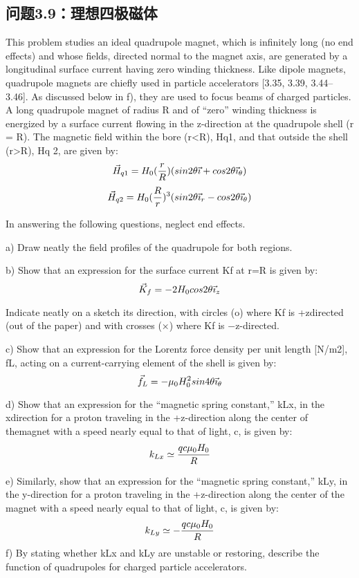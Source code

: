 \subsection{问题3.9：理想四极磁体}
This problem studies an ideal quadrupole magnet, which is infinitely long (no end
effects) and whose fields, directed normal to the magnet axis, are generated by a
longitudinal surface current having zero winding thickness. Like dipole magnets,
quadrupole magnets are chiefly used in particle accelerators [3.35, 3.39, 3.44–3.46].
As discussed below in f), they are used to focus beams of charged particles.
A long quadrupole magnet of radius R and of “zero” winding thickness is energized
by a surface current flowing in the z-direction at the quadrupole shell (r = R).
The magnetic field within the bore (r<R), Hq1, and that outside the shell (r>R),
Hq
2, are given by:
$$
\vec{H}_{q1}=H_{0}(\frac{r}{R})(sin2\theta\vec{\imath}+cos2\theta\vec{\imath}_{\theta})\\%
$$
$$
\vec{H}_{q2}=H_{0}(\frac{R}{r})^{3}(sin2\theta\vec{\imath}_{r}-cos2\theta\vec{\imath}_{\theta})\\%
$$

In answering the following questions, neglect end effects.

a) Draw neatly the field profiles of the quadrupole for both regions.

b) Show that an expression for the surface current Kf at r=R is given by:
$$
\vec{K}_{f}=-2H_{0}cos2\theta\vec{\imath}_{z}\\%
$$

Indicate neatly on a sketch its direction, with circles (o) where Kf is +zdirected (out of the paper) and with crosses (×) where Kf is −z-directed.

c) Show that an expression for the Lorentz force density per unit length [N/m2],
fL, acting on a current-carrying element of the shell is given by:
$$
\vec{f}_{L}=-\mu_{0}H_{0}^{2}sin4\theta\vec{\imath}_{\theta}\\%
$$

d) Show that an expression for the “magnetic spring constant,” kLx, in the xdirection for a proton traveling in the +z-direction along the center of themagnet with a speed nearly equal to that of light, c, is given by:
$$
k_{Lx}\simeq\frac{qc\mu_{0}H_{0}}{R}\\%
$$

e) Similarly, show that an expression for the “magnetic spring constant,” kLy,
in the y-direction for a proton traveling in the +z-direction along the center
of the magnet with a speed nearly equal to that of light, c, is given by:
$$
k_{Ly}\simeq-\frac{qc\mu_{0}H_{0}}{R}\\%
$$
f) By stating whether kLx and kLy are unstable or restoring, describe the function of quadrupoles for charged particle accelerators.

